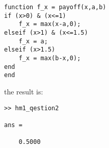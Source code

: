 \documentclass[letterpaper,11pt]{article}
\begin{document}
\begin{spacing}{1.2}
\begin{lstlisting}
function f_x = payoff(x,a,b)
if (x>0) & (x<=1)
    f_x = max(x-a,0);
elseif (x>1) & (x<=1.5)
    f_x = a;
elseif (x>1.5)
    f_x = max(b-x,0);
end
end
\end{lstlisting}
the result is:
\begin{lstlisting}
>> hm1_qestion2

ans =

    0.5000
\end{lstlisting}
\end{spacing}
\end{document}
